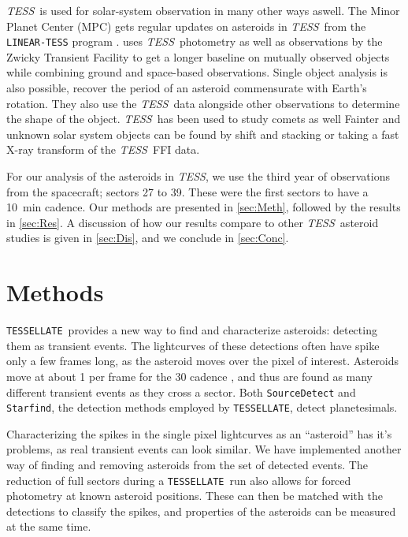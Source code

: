 \documentclass[12pt]{article}
\newcommand{\ttt}{\texttt}
\newcommand{\tess}{\textit{TESS}}
\newcommand{\tessellate}{\texttt{TESSELLATE}}
\begin{document}
\tess\ is used for solar-system observation in many other ways aswell.
The Minor Planet Center (MPC) gets regular updates on asteroids in \tess\ from the \ttt{LINEAR-TESS} program \citep{Woods2021}.
\citet{Gowanlock2024} uses \tess\ photometry as well as observations by the Zwicky Transient Facility \citep[ZTF, ][]{Bellm2019} to get a longer baseline on mutually observed objects while combining ground and space-based observations.
Single object analysis is also possible, \citet{Humes2024} recover the period of an asteroid commensurate with Earth's rotation.
They also use the \tess\ data alongside other observations to determine the shape of the object.
\tess\ has been used to study comets as well \citep[e.g.][]{Ridden-Harper2021b}
Fainter and unknown solar system objects can be found by shift and stacking \citep{Holman2019, Payne2019, Rice2020} or taking a fast X-ray transform \citep{Nguyen2024} of the \tess\ FFI data.

For our analysis of the asteroids in \tess, we use the third year of observations from the spacecraft; sectors 27 to 39.
These were the first sectors to have a \qty{10}{\minute} cadence.
Our methods are presented in \autoref{sec:Meth}, followed by the results in \autoref{sec:Res}.
A discussion of how our results compare to other \tess\ asteroid studies is given in \autoref{sec:Dis}, and we conclude in \autoref{sec:Conc}.

\section{Methods}\label{sec:Meth}


\tessellate\ provides a new way to find and characterize asteroids: detecting them as transient events.
The lightcurves of these detections often have spike only a few frames long, as the asteroid moves over the pixel of interest.
Asteroids move at about \qty{1}{\px} per frame for the \qty{30}{\min} cadence \citep{Pal2018}, and thus are found as many different transient events as they cross a sector.
Both \ttt{SourceDetect} and \ttt{Starfind}, the detection methods employed by \tessellate, detect planetesimals.

Characterizing the spikes in the single pixel lightcurves as an ``asteroid'' has it's problems, as real transient events can look similar.
We have implemented another way of finding and removing asteroids from the set of detected events.
The reduction of full sectors during a \tessellate\ run also allows for forced photometry at known asteroid positions.
These can then be matched with the detections to classify the spikes, and properties of the asteroids can be measured at the same time.
\end{document}
